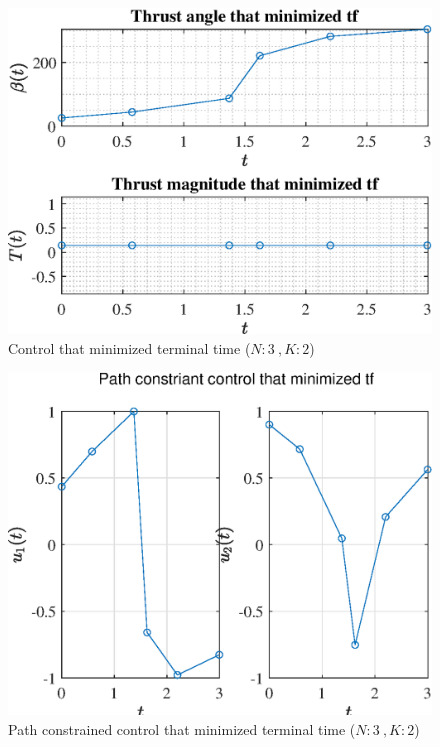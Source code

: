 \documentclass[]{article}
\begin{document}
	\begin{figure}
		\centering
		\includegraphics[scale=0.75]{control_N3_K2_C3_tf.eps}
		\caption{Control that minimized terminal time (\(N:3\ , K:2\))}
		\label{fig:control_N3_K2_C3_tf}
	\end{figure}
	\begin{figure}
		\centering
		\includegraphics[scale=0.75]{path_N3_K2_C3_tf.eps}
		\caption{Path constrained control that minimized terminal time (\(N:3\ , K:2\))}
		\label{fig:path_N3_K2_C3_tf}
	\end{figure}
\end{document}
